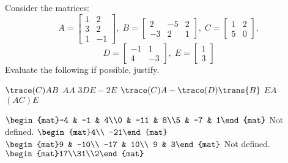 
\begin{Exercise}[
name={},
title={}, 
difficulty=0,
origin={\cite{YL}}]
Consider the matrices:
\[
A =\begin{bmatrix}
1 & 2 \\
3 & 2 \\
1 & -1
\end{bmatrix},\; B=
\begin{bmatrix}
2 & -5 & 2 \\
-3 & 2 & 1
\end{bmatrix},\; 
C = \begin{bmatrix}
1 & 2 \\
5 & 0
\end{bmatrix},
\]
\[D=
\begin{bmatrix}
-1 & 1 \\
4 & -3
\end{bmatrix},\; E=
\begin{bmatrix}
1 \\
3
\end{bmatrix}
\]
Evaluate the following if possible, justify.
\begin{multicols}{2}
\Question $\trace(C)AB$
\Question $AA$
\Question $3DE-2E$
\Question $\trace(C)A-\trace(D)\trans{B}$ 
\Question $EA$
\Question $(AC)E$
\EndCurrentQuestion
\end{multicols}
\end{Exercise}

\begin{Answer}
\Question $\begin{mat}-4 & -1 & 4\\0 & -11 & 8\\5 & -7 & 1\end{mat}$
\Question Not defined.
\Question $\begin{mat}4\\ -21\end{mat}$
\Question $\begin{mat}9 & -10\\ -17 & 10\\ 9 & 3\end{mat}$
\Question Not defined.
\Question $\begin{mat}17\\31\\2\end{mat}$
\end{Answer}
